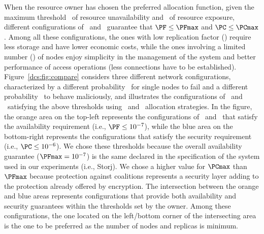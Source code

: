 {When the resource owner has chosen the preferred allocation function,
given the maximum threshold \PFmax\ of resource unavailability and
\PCmax\ of resource exposure, different configurations of \nk\ and
\nr\ guarantee that $\PF \leq \PFmax$ and $\PC \leq \PCmax$. Among all
these configurations, the ones with low replication factor (\nr)
require less storage and have lower economic costs, while the ones
involving a limited number (\nn) of nodes enjoy simplicity in the
management of the system and better performance of access operations
(less connections have to be established).  Figure~\ref{dcs:fig:compare}
considers three different network configurations, characterized by a
different probability \pf\ for single nodes to fail and a different
probability \pc\ to behave maliciously, and illustrates the
configurations of \nk\ and \nr\ satisfying the above thresholds using
\diagonal\ and \compact\ allocation strategies. In the figure, the
orange area on the top-left represents the configurations of \nk\ and
\nr\ that satisfy the availability requirement (i.e., $\PF \leq
10^{-7}$), while the blue area on the bottom-right represents the
configurations that satisfy the security requirement (i.e., $\PC \leq
10^{-6}$). We chose these thresholds because the overall availability
guarantee ($\PFmax = 10^{-7}$) is the same declared in the
specification of the system used in our experiments (i.e., Storj). We
chose a higher value for $\PCmax$ than $\PFmax$ because protection
against coalitions represents a security layer adding to the
protection already offered by encryption. The intersection between the
orange and blue areas represents configurations that provide both
availability and security guarantees within the thresholds set by the
owner. Among these configurations, the one located on the left/bottom
corner of the intersecting area is the one to be preferred as the
number of nodes and replicas is minimum.


}
